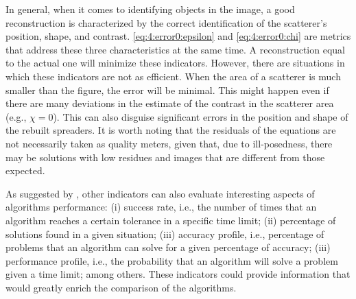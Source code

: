 		In general, when it comes to identifying objects in the image, a good reconstruction is characterized by the correct identification of the scatterer's position, shape, and contrast. \eqref{eq:4:error0:epsilon} and \eqref{eq:4:error0:chi} are metrics that address these three characteristics at the same time. A reconstruction equal to the actual one will minimize these indicators. However, there are situations in which these indicators are not as efficient. When the area of a scatterer is much smaller than the figure, the error will be minimal. This might happen even if there are many deviations in the estimate of the contrast in the scatterer area (e.g., $\chi=0$). This can also disguise significant errors in the position and shape of the rebuilt spreaders. It is worth noting that the residuals of the equations are not necessarily taken as quality meters, given that, due to ill-posedness, there may be solutions with low residues and images that are different from those expected.
		
		As suggested by \cite{beiranvand2017best}, other indicators can also evaluate interesting aspects of algorithms performance: (i) success rate, i.e., the number of times that an algorithm reaches a certain tolerance in a specific time limit; (ii) percentage of solutions found in a given situation; (iii) accuracy profile, i.e., percentage of problems that an algorithm can solve for a given percentage of accuracy; (iii) performance profile, i.e., the probability that an algorithm will solve a problem given a time limit; among others. These indicators could provide information that would greatly enrich the comparison of the algorithms.
		
